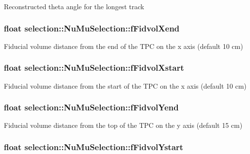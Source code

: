Reconstructed theta angle for the longest track \hypertarget{classselection_1_1NuMuSelection_ab57daae1ee3ed13b58016eb68f0d6712}{
\subsubsection[{f\-Fidvol\-Xend}]{\setlength{\rightskip}{0pt plus 5cm}float selection\-::\-Nu\-Mu\-Selection\-::f\-Fidvol\-Xend\hspace{0.3cm}{\ttfamily [private]}}}\label{classselection_1_1NuMuSelection_ab57daae1ee3ed13b58016eb68f0d6712}
Fiducial volume distance from the end of the T\-P\-C on the x axis (default 10 cm) \hypertarget{classselection_1_1NuMuSelection_a5f015a245b7a149756f787f2dab9fcc7}{
\subsubsection[{f\-Fidvol\-Xstart}]{\setlength{\rightskip}{0pt plus 5cm}float selection\-::\-Nu\-Mu\-Selection\-::f\-Fidvol\-Xstart\hspace{0.3cm}{\ttfamily [private]}}}\label{classselection_1_1NuMuSelection_a5f015a245b7a149756f787f2dab9fcc7}
Fiducial volume distance from the start of the T\-P\-C on the x axis (default 10 cm) \hypertarget{classselection_1_1NuMuSelection_ac07847d191d7d4db8267d89e0caab414}{
\subsubsection[{f\-Fidvol\-Yend}]{\setlength{\rightskip}{0pt plus 5cm}float selection\-::\-Nu\-Mu\-Selection\-::f\-Fidvol\-Yend\hspace{0.3cm}{\ttfamily [private]}}}\label{classselection_1_1NuMuSelection_ac07847d191d7d4db8267d89e0caab414}
Fiducial volume distance from the top of the T\-P\-C on the y axis (default 15 cm) \hypertarget{classselection_1_1NuMuSelection_a68277003f5211d751a5965dc990ff661}{
\subsubsection[{f\-Fidvol\-Ystart}]{\setlength{\rightskip}{0pt plus 5cm}float selection\-::\-Nu\-Mu\-Selection\-::f\-Fidvol\-Ystart\hspace{0.3cm}{\ttfamily [private]}}}\label{classselection_1_1NuMuSelection_a68277003f5211d751a5965dc990ff661}
